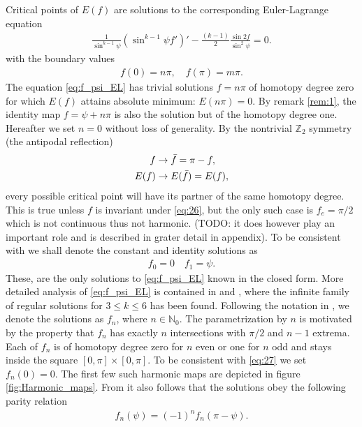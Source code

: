 Critical points of $E(f)$ are solutions to the corresponding
Euler-Lagrange equation
\begin{align}
  \label{eq:f_psi_EL} \frac{1}{\sin^{k-1}\psi}\left(\sin^{k-1}\psi
    f'\right)'-\frac{(k-1)}{2}\frac{\sin2f}{\sin^2\psi}=0.
\end{align} with the boundary values
\begin{align}
  \label{eq:24} f(0)=n\pi,\quad f(\pi)=m\pi.
\end{align} The equation \eqref{eq:f_psi_EL} has trivial solutions
$f=n\pi$ of homotopy degree zero for which $E(f)$ attains absolute
minimum: $E(n\pi)=0$. By remark \ref{rem:1}, the identity map
$f=\psi+n\pi$ is also the solution but of the homotopy degree one.
Hereafter we set $n=0$ without loss of generality.
By the nontrivial $\mathbb{Z}_2$ symmetry (the antipodal
reflection)
\begin{align}
  \label{eq:26}
  f&\rightarrow \bar{f}=\pi-f,\\
  E(f)&\rightarrow E(\bar{f})=E(f),
\end{align}
every possible critical point will have its partner of the same
homotopy degree. This is true unless $f$ is invariant under
\eqref{eq:26}, but the only such case is $f_e=\pi/2$ which is not
continuous thus not harmonic. (TODO: it does however play an important
role and is described in grater detail in appendix). To be consistent
with \cite{Bizon1997} we shall denote the constant and identity
solutions as
\begin{align}
  \label{eq:27}
  f_0=0\quad f_1=\psi.
\end{align}
These, are the only solutions to \eqref{eq:f_psi_EL} known in the
closed form. More detailed analysis of \eqref{eq:f_psi_EL} is
contained in \cite{Bizon1997} and \cite{Corlette2001}, where the
infinite family of regular solutions for $3\le k\le6$ has been
found. Following the notation in \cite{Bizon1997}, we denote the
solutions as $f_n$, where $n\in\mathbb{N}_0$. The parametrization by
$n$ is motivated by the property that $f_n$ has exactly $n$
intersections with $\pi/2$ and $n-1$ extrema. Each of $f_n$ is of
homotopy degree zero for $n$ even or one for $n$ odd and stays inside
the square $[0,\pi]\times[0,\pi]$. To be consistent with \eqref{eq:27}
we set $f_n(0)=0$. The first few such harmonic maps are depicted in
figure \ref{fig:Harmonic_maps}. From \cite{Bizon1997} it also follows
that the solutions obey the following parity relation
\begin{align}
  \label{eq:28}
  f_n(\psi)=(-1)^n f_n(\pi-\psi).
\end{align}

